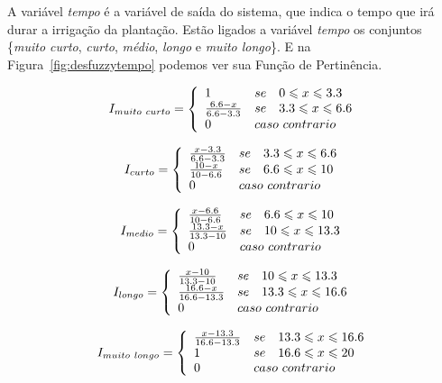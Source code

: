 \documentclass[
	article,			%
	11pt,				%
	oneside,			%
	a4paper,			%
	english,			%
	brazil,				%
	sumario=tradicional
	]{abntex2}
\begin{document}
\begin{multicols}{2}
A variável \textit{tempo} é a variável de saída do sistema, que indica o tempo que irá durar a irrigação da plantação. Estão ligados a variável \textit{tempo} os conjuntos \{\textit{muito curto}, \textit{curto}, \textit{médio}, \textit{longo} e \textit{muito longo}\}. E na Figura~\ref{fig:desfuzzytempo} podemos ver sua Função de Pertinência.

$$
  I_{muito~curto} = \left\{
  \begin{array}{lll}
  1 & se & 0 \leqslant x \leqslant 3.3 \\
  \frac{6.6 - x}{6.6 - 3.3} & se & 3.3 \leqslant x \leqslant 6.6 \\
  0 & \multicolumn{2}{l}{caso~contrario}
  \end{array}
  \right.
$$

$$
  I_{curto} = \left\{
  \begin{array}{lll}
  \frac{x - 3.3}{6.6 - 3.3} & se & 3.3 \leqslant x \leqslant 6.6 \\
  \frac{10 - x}{10 - 6.6} & se & 6.6 \leqslant x \leqslant 10 \\
  0 & \multicolumn{2}{l}{caso~contrario}
  \end{array}
  \right.
$$

$$
  I_{medio} = \left\{
  \begin{array}{lll}
  \frac{x - 6.6}{10 - 6.6} & se & 6.6 \leqslant x \leqslant 10 \\
  \frac{13.3 - x}{13.3 - 10} & se & 10 \leqslant x \leqslant 13.3 \\
  0 & \multicolumn{2}{l}{caso~contrario}
  \end{array}
  \right.
$$

$$
  I_{longo} = \left\{
  \begin{array}{lll}
  \frac{x - 10}{13.3 - 10} & se & 10 \leqslant x \leqslant 13.3 \\
  \frac{16.6 - x}{16.6 - 13.3} & se & 13.3 \leqslant x \leqslant 16.6 \\
  0 & \multicolumn{2}{l}{caso~contrario}
  \end{array}
  \right.
$$

$$
  I_{muito~longo} = \left\{
  \begin{array}{lll}
  \frac{x - 13.3}{16.6 - 13.3} & se & 13.3 \leqslant x \leqslant 16.6 \\
  1 & se & 16.6 \leqslant x \leqslant 20 \\
  0 & \multicolumn{2}{l}{caso~contrario}
  \end{array}
  \right.
$$


\end{multicols}
\end{document}
